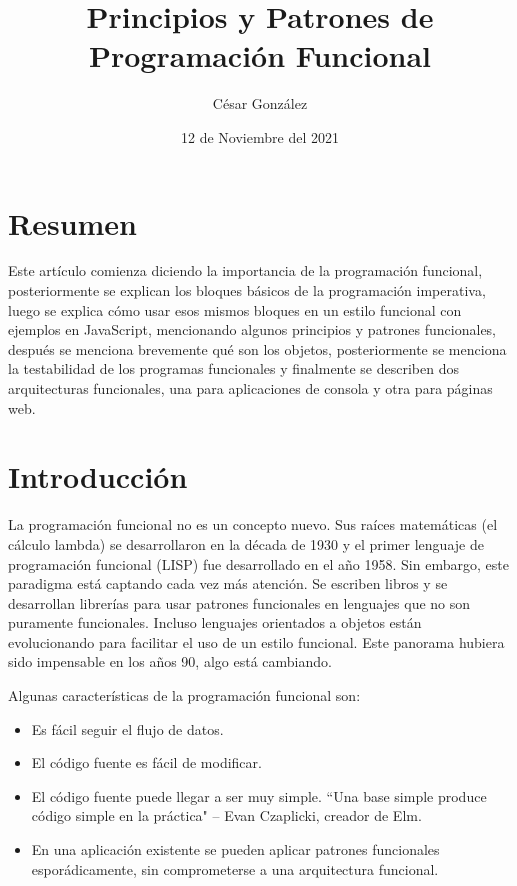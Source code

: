 \documentclass{article}
\begin{document}
\title{\Large{\textbf{Principios y Patrones de Programación Funcional}}}
\author{César González}
\date{12 de Noviembre del 2021}
\maketitle


\pagebreak
\section*{Resumen}
Este artículo comienza diciendo la importancia de la programación funcional, posteriormente se explican los bloques básicos de la programación imperativa, luego se explica cómo usar esos mismos bloques en un estilo funcional con ejemplos en JavaScript, mencionando algunos principios y patrones funcionales, después se menciona brevemente qué son los objetos, posteriormente se menciona la testabilidad de los programas funcionales y finalmente se describen dos arquitecturas funcionales, una para aplicaciones de consola y otra para páginas web.

\section*{Introducción}
La programación funcional no es un concepto nuevo. Sus raíces matemáticas (el cálculo lambda) se desarrollaron en la década de 1930 y el primer lenguaje de programación funcional (LISP) fue desarrollado en el año 1958. Sin embargo, este paradigma está captando cada vez más atención. Se escriben libros y se desarrollan librerías para usar patrones funcionales en lenguajes que no son puramente funcionales. Incluso lenguajes orientados a objetos están evolucionando para facilitar el uso de un estilo funcional. Este panorama hubiera sido impensable en los años 90, algo está cambiando.\cite{why-isnt-fp-norm}

Algunas características de la programación funcional son:
\begin{itemize}
  \item Es fácil seguir el flujo de datos.
  \item El código fuente es fácil de modificar.
  \item El código fuente puede llegar a ser muy simple. ``Una base simple produce código simple en la práctica" \medspace – Evan Czaplicki, creador de Elm.\cite{mainstream-elm}
  \item En una aplicación existente se pueden aplicar patrones funcionales esporádicamente, sin comprometerse a una arquitectura funcional.\cite{skeptics-functional-style}
\end{itemize}
\end{document}
